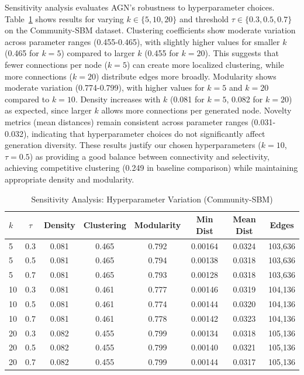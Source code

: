 \documentclass[12pt]{article}
\begin{document}
Sensitivity analysis evaluates AGN's robustness to hyperparameter choices. Table~\ref{tab:sensitivity} shows results for varying $k \in \{5, 10, 20\}$ and threshold $\tau \in \{0.3, 0.5, 0.7\}$ on the Community-SBM dataset. Clustering coefficients show moderate variation across parameter ranges (0.455-0.465), with slightly higher values for smaller $k$ (0.465 for $k=5$) compared to larger $k$ (0.455 for $k=20$). This suggests that fewer connections per node ($k=5$) can create more localized clustering, while more connections ($k=20$) distribute edges more broadly. Modularity shows moderate variation (0.774-0.799), with higher values for $k=5$ and $k=20$ compared to $k=10$. Density increases with $k$ (0.081 for $k=5$, 0.082 for $k=20$) as expected, since larger $k$ allows more connections per generated node. Novelty metrics (mean distances) remain consistent across parameter ranges (0.031-0.032), indicating that hyperparameter choices do not significantly affect generation diversity. These results justify our chosen hyperparameters ($k=10$, $\tau=0.5$) as providing a good balance between connectivity and selectivity, achieving competitive clustering (0.249 in baseline comparison) while maintaining appropriate density and modularity.

\begin{table}[h]
\centering
\caption{Sensitivity Analysis: Hyperparameter Variation (Community-SBM)}
\label{tab:sensitivity}
\small
\begin{tabular}{lccccccc}
\toprule
$k$ & $\tau$ & Density & Clustering & Modularity & Min Dist & Mean Dist & Edges \\
\midrule
5 & 0.3 & 0.081 & 0.465 & 0.792 & 0.00164 & 0.0324 & 103,636 \\
5 & 0.5 & 0.081 & 0.465 & 0.794 & 0.00138 & 0.0318 & 103,636 \\
5 & 0.7 & 0.081 & 0.465 & 0.793 & 0.00128 & 0.0318 & 103,636 \\
10 & 0.3 & 0.081 & 0.461 & 0.777 & 0.00146 & 0.0319 & 104,136 \\
10 & 0.5 & 0.081 & 0.461 & 0.774 & 0.00144 & 0.0320 & 104,136 \\
10 & 0.7 & 0.081 & 0.461 & 0.778 & 0.00142 & 0.0323 & 104,136 \\
20 & 0.3 & 0.082 & 0.455 & 0.799 & 0.00134 & 0.0318 & 105,136 \\
20 & 0.5 & 0.082 & 0.455 & 0.799 & 0.00140 & 0.0321 & 105,136 \\
20 & 0.7 & 0.082 & 0.455 & 0.799 & 0.00144 & 0.0317 & 105,136 \\
\bottomrule
\end{tabular}
\end{table}
\end{document}
